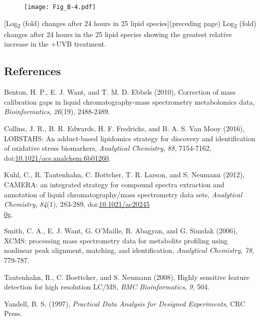 \clearpage

\begin{figure}[!p]
\centering
\texttt{[image: Fig\_B-4.pdf]}
\end{figure}
\clearpage
\begingroup
{}
[Log\textsubscript{2} (fold) changes after 24 hours in 25 lipid species]{(preceding page) Log\textsubscript{2} (fold) changes after 24 hours in the 25 lipid species showing the greatest relative increase in the +UVB treatment.}
\label{fig:abn4}
\endgroup

\clearpage

\begin{singlespace}
\section*{References}
\addtocounter{section}{1}
{\setlength{\parindent}{0pt}
Benton, H. P., E. J. Want, and T. M. D. Ebbels (2010), Correction of mass calibration gaps in liquid chromatography-mass spectrometry metabolomics data, \emph{Bioinformatics}, \emph{26}(19), 2488-2489.

{\setlength{\parskip}{10pt}

Collins, J. R., B. R. Edwards, H. F. Fredricks, and B. A. S. Van Mooy (2016), LOBSTAHS: An adduct-based lipidomics strategy for discovery and identification of oxidative stress biomarkers, \emph{Analytical Chemistry}, \emph{88}, 7154-7162, doi:\href{http://dx.doi.org/10.1021/acs.analchem.6b01260}{10.1021/acs.analchem.6b01260}.

Kuhl, C., R. Tautenhahn, C. Bottcher, T. R. Larson, and S. Neumann (2012), CAMERA: an integrated strategy for compound spectra extraction and annotation of liquid chromatography/mass spectrometry data sets, \emph{Analytical Chemistry}, \emph{84}(1), 283-289, doi:\href{http://dx.doi.org/10.1021/ac202450g}{10.1021/ac20245\\0g}.

Smith, C. A., E. J. Want, G. O'Maille, R. Abagyan, and G. Siuzdak (2006), XCMS: processing mass spectrometry data for metabolite profiling using nonlinear peak alignment, matching, and identification, \emph{Analytical Chemistry}, \emph{78}, 779-787.

Tautenhahn, R., C. Boettcher, and S. Neumann (2008), Highly sensitive feature detection for high resolution LC/MS, \emph{BMC Bioinformatics}, \emph{9}, 504.

Yandell, B. S. (1997), \emph{Practical Data Analysis for Designed Experiments}, CRC Press.}}
\end{singlespace}